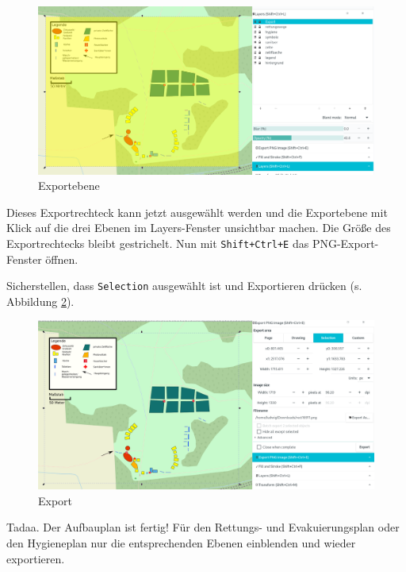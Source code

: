 \documentclass[letterpaper,12pt,
				parkskip = half]{article}
\begin{document}
\begin{figure}[!h]
	\centering
	\includegraphics[width=\textwidth]{Images/export.png}
	\caption{Exportebene}
	\label{fig:exportlayer}
\end{figure}


Dieses Exportrechteck kann jetzt ausgewählt werden und die Exportebene mit Klick auf die drei Ebenen im Layers-Fenster unsichtbar machen. Die Größe des Exportrechtecks bleibt gestrichelt. Nun mit \texttt{Shift+Ctrl+E} das PNG-Export-Fenster öffnen.

Sicherstellen, dass \texttt{Selection} ausgewählt ist und \flqq{}Exportieren\frqq{} drücken (s. Abbildung \ref{fig:export2}).

\begin{figure}[!h]
	\centering
	\includegraphics[width=\textwidth]{Images/export2.png}
	\caption{Export}
	\label{fig:export2}
\end{figure}

Tadaa. Der Aufbauplan ist fertig! Für den Rettungs- und Evakuierungsplan oder den Hygieneplan nur die entsprechenden Ebenen einblenden und wieder exportieren.
\end{document}
